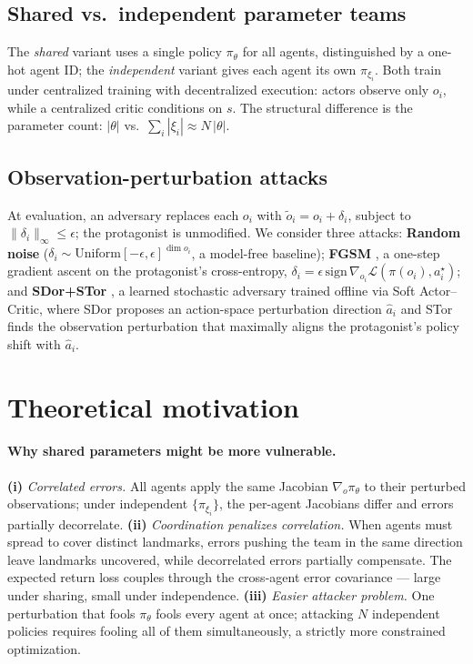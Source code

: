 \documentclass{article}
\begin{document}
\subsection{Shared vs.\ independent parameter teams}
The \emph{shared} variant uses a single policy $\pi_\theta$ for all agents, distinguished by a one-hot agent ID; the \emph{independent} variant gives each agent its own $\pi_{\xi_i}$. Both train under centralized training with decentralized execution: actors observe only $o_i$, while a centralized critic conditions on $s$. The structural difference is the parameter count: $|\theta|$ vs.\ $\sum_i |\xi_i| \approx N\,|\theta|$.

\subsection{Observation-perturbation attacks}
At evaluation, an adversary replaces each $o_i$ with $\tilde{o}_i = o_i + \delta_i$, subject to $\|\delta_i\|_\infty \leq \epsilon$; the protagonist is unmodified. We consider three attacks: \textbf{Random noise} ($\delta_i \sim \mathrm{Uniform}[-\epsilon,\epsilon]^{\dim o_i}$, a model-free baseline); \textbf{FGSM} \citep{goodfellow2014explaining}, a one-step gradient ascent on the protagonist's cross-entropy, $\delta_i = \epsilon \, \mathrm{sign}\,\nabla_{o_i}\mathcal{L}(\pi(o_i), a_i^\star)$; and \textbf{SDor+STor} \citep{zhou2025robust}, a learned stochastic adversary trained offline via Soft Actor--Critic, where SDor proposes an action-space perturbation direction $\hat{a}_i$ and STor finds the observation perturbation that maximally aligns the protagonist's policy shift with $\hat{a}_i$.


\section{Theoretical motivation}
\label{sec:theory}

\paragraph{Why shared parameters might be more vulnerable.}
\textbf{(i)} \textit{Correlated errors.} All agents apply the same Jacobian $\nabla_o \pi_\theta$ to their perturbed observations; under independent $\{\pi_{\xi_i}\}$, the per-agent Jacobians differ and errors partially decorrelate.
\textbf{(ii)} \textit{Coordination penalizes correlation.} When agents must spread to cover distinct landmarks, errors pushing the team in the same direction leave landmarks uncovered, while decorrelated errors partially compensate. The expected return loss couples through the cross-agent error covariance --- large under sharing, small under independence.
\textbf{(iii)} \textit{Easier attacker problem.} One perturbation that fools $\pi_\theta$ fools every agent at once; attacking $N$ independent policies requires fooling all of them simultaneously, a strictly more constrained optimization.
\end{document}

